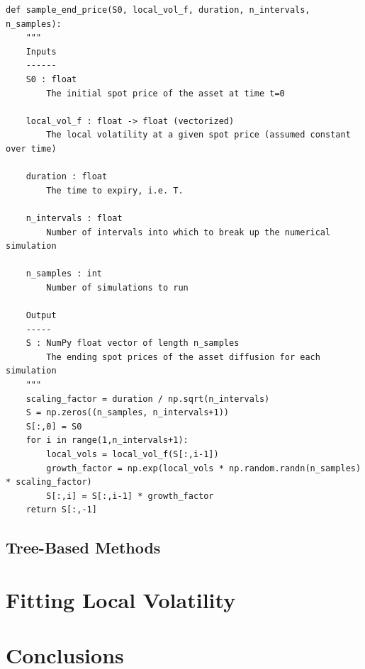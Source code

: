 \documentclass[12pt]{article}
\numberwithin{equation}{section}
\begin{document}
\begin{lstlisting}[float=*,
    caption=Sampling from Risk-Neutral $S_T$ Distribution,
    label=lst:sampleendprice]
def sample_end_price(S0, local_vol_f, duration, n_intervals, n_samples):
    """
    Inputs
    ------
    S0 : float
        The initial spot price of the asset at time t=0
        
    local_vol_f : float -> float (vectorized)
        The local volatility at a given spot price (assumed constant over time)
        
    duration : float
        The time to expiry, i.e. T.
    
    n_intervals : float
        Number of intervals into which to break up the numerical simulation
    
    n_samples : int
        Number of simulations to run
        
    Output
    -----
    S : NumPy float vector of length n_samples
        The ending spot prices of the asset diffusion for each simulation
    """
    scaling_factor = duration / np.sqrt(n_intervals)
    S = np.zeros((n_samples, n_intervals+1))
    S[:,0] = S0
    for i in range(1,n_intervals+1):
        local_vols = local_vol_f(S[:,i-1])
        growth_factor = np.exp(local_vols * np.random.randn(n_samples) * scaling_factor)
        S[:,i] = S[:,i-1] * growth_factor
    return S[:,-1]
\end{lstlisting}

\subsection{Tree-Based Methods}
\label{subsec:treepricing}

\section{Fitting Local Volatility}
\label{sec:localvolfitting}

\section{Conclusions}



\end{document}
